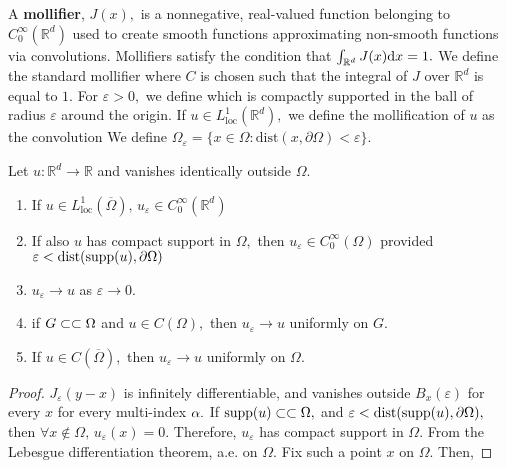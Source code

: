 A \textbf{mollifier}, $J(x),$ is a nonnegative, real-valued function belonging to $C_0^\infty(\mathbb{R}^d)$ used to create smooth functions approximating non-smooth functions via convolutions. Mollifiers satisfy the condition that $\int_{\mathbb{R}^d}J(x)\mathrm{d} x=1.$ We define the standard mollifier
where $C$ is chosen such that the integral of $J$ over $\mathbb{R}^d$ is equal to $1.$ For $\varepsilon>0,$ we define
which is compactly supported in the ball of radius $\varepsilon$ around the origin. If $u\in L^1_\mathrm{loc}(\mathbb{R}^d),$ we define the mollification of $u$ as the convolution
We define $\Omega_\varepsilon=\{x\in\Omega:\mathrm{dist}(x,\partial\Omega)<\varepsilon\}.$
\begin{theorem}
    Let $u:\mathbb{R}^d\rightarrow\mathbb{R}$ and vanishes identically outside $\Omega.$
    \begin{enumerate}
        \item If $u\in L^1_\mathrm{loc}(\overline{\Omega}),\,u_\varepsilon\in C_0^\infty(\mathbb{R}^d)$
        \item If also $u$ has compact support in $\Omega,$ then $u_\varepsilon\in C_0^\infty(\Omega)$ provided $\varepsilon<\mathrm{dist}(\mathrm{supp}(u),\partial\Omega)$
        \item $u_\varepsilon\rightarrow u$ as $\varepsilon\rightarrow0.$
        \item if $G\subset\subset\Omega$ and $u\in C(\Omega),$ then $u_\varepsilon\rightarrow u$ uniformly on $G.$
        \item If $u\in C(\overline{\Omega}),$ then $u_\varepsilon\rightarrow u$ uniformly on $\Omega.$
    \end{enumerate}
\end{theorem}
\begin{proof}
$J_\varepsilon(y-x)$ is infinitely differentiable, and vanishes outside $B_{x}(\varepsilon)$ for every $x$ for every multi-index $\alpha.$ If $\mathrm{supp}(u)\subset\subset\Omega,$ and $\varepsilon<\mathrm{dist} (\mathrm{supp}(u), \partial\Omega),$ then $\forall x\notin\Omega,\,u_\varepsilon(x)=0.$ Therefore, $u_\varepsilon$ has compact support in $\Omega.$
From the Lebesgue differentiation theorem,
a.e. on $\Omega.$ Fix such a point $x$ on $\Omega.$ Then,
\end{proof}


